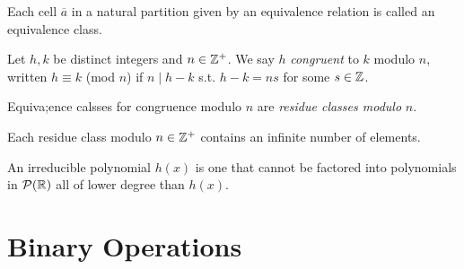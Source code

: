 \begin{definition}
    Each cell $\overline{a}$ in a natural partition given by an equivalence relation is called an equivalence class.
\end{definition}
\begin{definition}
    Let $h,k$ be distinct integers and $n \in \mathbb{Z}^+$. We say $h$ \textit{congruent} to $k$ modulo $n$, written $h \equiv k$ (mod $n$) if $n \mid h-k$ s.t. $h-k = ns$ for some $s \in \mathbb{Z}$.
\end{definition}
\begin{definition}
    Equiva;ence calsses for congruence modulo $n$ are \textit{residue classes modulo} $n$.
\end{definition}
\begin{remark}
    Each residue class modulo $n \in \mathbb{Z}^+$ contains an infinite number of elements.
\end{remark}
\begin{definition}[Irreducible]
    An irreducible polynomial $h(x)$ is one that cannot be factored into polynomials in $\mathcal{P}(\mathbb{R})$ all of lower degree than $h(x)$.
\end{definition}

\section{Binary Operations}
    
